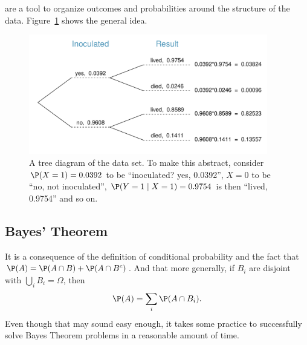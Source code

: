 
 are a tool to organize outcomes and probabilities around the structure of the data.  Figure~\ref{smallpoxTreeDiagram} shows the general idea.
\begin{figure}%
\centering
\includegraphics[width=0.93\textwidth]{ch_probability/figures/smallpoxTreeDiagram/smallpoxTreeDiagram}
\caption{A tree diagram of the  data set. To make this abstract, consider $\P(X=1)=0.0392$ to be ``inoculated? yes, 0.0392'', $X=0$ to be ``no, not inoculated'', $\P(Y=1\mid X=1)=0.9754$ is then ``lived, 0.9754'' and so on.}
\label{smallpoxTreeDiagram}
\end{figure}



\subsection{Bayes' Theorem}
\label{bayesTheoremSubsection}


It is a consequence of the definition of conditional probability and the fact that $\P(A) = \P(A\cap B) + \P(A\cap B^c)$. And that more generally, if $B_i$ are disjoint with $\bigcup_i B_i=\Omega$, then
\[
	\P(A) = \sum_i \P(A\cap B_i).
\]
Even though that may sound easy enough, it takes some practice to successfully solve Bayes Theorem problems in a reasonable amount of time.

